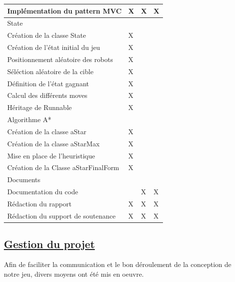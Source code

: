 \documentclass[12pt]{article}
\begin{document}
\begin{center}
\begin{tabular}{||p{7cm}|>{\centering\arraybackslash}p{2cm}|>{\centering\arraybackslash}p{2cm}|>{\centering\arraybackslash}p{2cm}||}
                Implémentation du pattern MVC & X & X & X\\   
            \hline %
                \rowcolor{bluepale} State & & &\\
                 Création de la classe State & X & &\\
                 \hline
                Création de l'état initial du jeu & X & &\\   
                \hline
                Positionnement aléatoire des robots & X & &\\
                \hline
                Séléction aléatoire de la cible & X & &\\
                \hline
                Définition de l'état gagnant & X & &\\
				\hline
				Calcul des différents moves & X & &\\
				\hline
				Héritage de Runnable & X & &\\
            \hline %
             \rowcolor{bluepale} Algorithme A* & & &\\
                Création de la classe aStar & X & & \\   
                \hline
                Création de la classe aStarMax & X & &\\  
                \hline
                 Mise en place de l'heuristique & X & &\\  
                \hline
				Création de la Classe aStarFinalForm & X & &\\
             \hline %
             \rowcolor{bluepale} Documents & & &\\
             	Documentation du code & & X & X\\
			 \hline
				Rédaction du rapport & X & X & X\\
             \hline
            	Rédaction du support de soutenance & X & X & X\\
            \hline %
        \end{tabular}
    \end{center}

\newpage
\subsection{\underline{Gestion du projet}}

Afin de faciliter la communication et le bon déroulement de la conception de notre jeu, divers moyens ont été mis en oeuvre.
\end{document}
